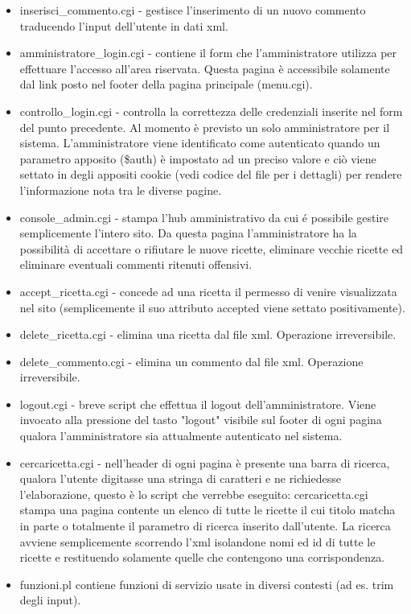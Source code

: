 \documentclass[12pt]{article}
\begin{document}
\begin{itemize}
				\item inserisci\_commento.cgi - gestisce l'inserimento di un nuovo commento traducendo l'input dell'utente in dati xml.

				\item amministratore\_login.cgi - contiene il form che l'amministratore utilizza per effettuare l'accesso all'area riservata. Questa pagina \`e accessibile solamente dal link posto nel footer della pagina principale (menu.cgi).

				\item controllo\_login.cgi - controlla la correttezza delle credenziali inserite nel form del punto precedente. Al momento \`e previsto un solo amministratore per il sistema. L'amministratore viene identificato come autenticato quando un parametro apposito (\$auth) \`e impostato ad un preciso valore e ci\`o viene settato in degli appositi cookie (vedi codice del file per i dettagli) per rendere l'informazione nota tra le diverse pagine.

				\item console\_admin.cgi - stampa l'hub amministrativo da cui \'e possibile gestire semplicemente l'intero sito. Da questa pagina l'amministratore ha la possibilit\`a di accettare o rifiutare le nuove ricette, eliminare vecchie ricette ed eliminare eventuali commenti ritenuti offensivi.

				\item accept\_ricetta.cgi - concede ad una ricetta il permesso di venire visualizzata nel sito (semplicemente il suo attributo accepted viene settato positivamente).

				\item delete\_ricetta.cgi - elimina una ricetta dal file xml. Operazione irreversibile.

				\item delete\_commento.cgi - elimina un commento dal file xml. Operazione irreversibile.

				\item logout.cgi - breve script che effettua il logout dell'amministratore. Viene invocato alla pressione del tasto "logout" visibile sul footer di ogni pagina qualora l'amministratore sia attualmente autenticato nel sistema.

				\item cercaricetta.cgi - nell'header di ogni pagina è presente una barra di ricerca, qualora l'utente digitasse una stringa di caratteri e ne richiedesse l'elaborazione, questo \`e lo script che verrebbe eseguito: cercaricetta.cgi stampa una pagina contente un elenco di tutte le ricette il cui titolo matcha in parte o totalmente il parametro di ricerca inserito dall'utente. La ricerca avviene semplicemente scorrendo l'xml isolandone nomi ed id di tutte le ricette e restituendo solamente quelle che contengono una corrispondenza.

				\item funzioni.pl  contiene funzioni di servizio usate in diversi contesti (ad es. trim degli input).	

\end{itemize}	
			
\end{document}
